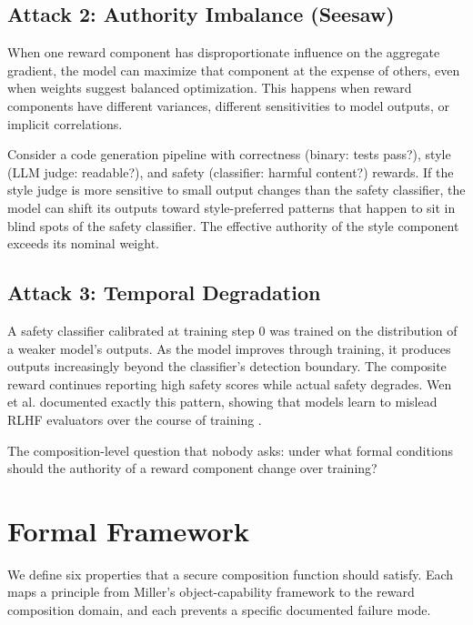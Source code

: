 \documentclass[11pt,a4paper]{article}
\begin{document}
\subsection{Attack 2: Authority Imbalance (Seesaw)}

When one reward component has disproportionate influence on the aggregate gradient, the model can maximize that component at the expense of others, even when weights suggest balanced optimization. This happens when reward components have different variances, different sensitivities to model outputs, or implicit correlations.

Consider a code generation pipeline with correctness (binary: tests pass?), style (LLM judge: readable?), and safety (classifier: harmful content?) rewards. If the style judge is more sensitive to small output changes than the safety classifier, the model can shift its outputs toward style-preferred patterns that happen to sit in blind spots of the safety classifier. The effective authority of the style component exceeds its nominal weight.

\subsection{Attack 3: Temporal Degradation}

A safety classifier calibrated at training step 0 was trained on the distribution of a weaker model's outputs. As the model improves through training, it produces outputs increasingly beyond the classifier's detection boundary. The composite reward continues reporting high safety scores while actual safety degrades. Wen et al. documented exactly this pattern, showing that models learn to mislead RLHF evaluators over the course of training \cite{wen2024mislead}.

The composition-level question that nobody asks: under what formal conditions should the authority of a reward component change over training?

\section{Formal Framework}

We define six properties that a secure composition function should satisfy. Each maps a principle from Miller's object-capability framework \cite{miller2006robust} to the reward composition domain, and each prevents a specific documented failure mode.
\end{document}
